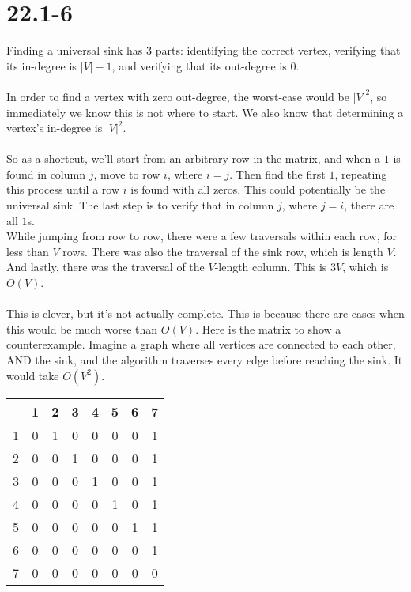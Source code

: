 \documentclass{article}
\begin{document}
\section*{22.1-6}
Finding a universal sink has 3 parts: identifying the correct vertex, verifying that its in-degree is
$|V|-1$, and verifying that its out-degree is $0$.\\
\\
In order to find a vertex with zero out-degree, the worst-case would be $|V|^2$, so immediately we know this
is not where to start. We also know that determining a vertex's in-degree is $|V|^2$.\\
\\
So as a shortcut, we'll start from an arbitrary row in the matrix, and when a $1$ is found in column $j$,
move to row $i$, where $i = j$. Then find the first $1$, repeating this process until a row $i$ is found with all
zeros. This could potentially be the universal sink. The last step is to verify that in column $j$, where $j = i$,
there are all $1$s.\\
While jumping from row to row, there were a few traversals within each row, for less than $V$ rows. There was also
the traversal of the sink row, which is length $V$. And lastly, there was the traversal of the $V$-length column.
This is $3V$, which is $O(V)$.\\
\\
This is clever, but it's not actually complete. This is because there are cases when this would be much worse than
$O(V)$. Here is the matrix to show a counterexample. Imagine a graph where all vertices are connected to each other,
AND the sink, and the algorithm traverses every edge before reaching the sink. It would take $O(V^2)$.\\
\begin{tabular}{|c|c c c c c c c|}
\hline
  & 1 & 2 & 3 & 4 & 5 & 6 & 7\\
\hline
1 & 0 & 1 & 0 & 0 & 0 & 0 & 1\\
2 & 0 & 0 & 1 & 0 & 0 & 0 & 1\\
3 & 0 & 0 & 0 & 1 & 0 & 0 & 1\\
4 & 0 & 0 & 0 & 0 & 1 & 0 & 1\\
5 & 0 & 0 & 0 & 0 & 0 & 1 & 1\\
6 & 0 & 0 & 0 & 0 & 0 & 0 & 1\\
7 & 0 & 0 & 0 & 0 & 0 & 0 & 0\\
\hline
\end{tabular}
\end{document}

